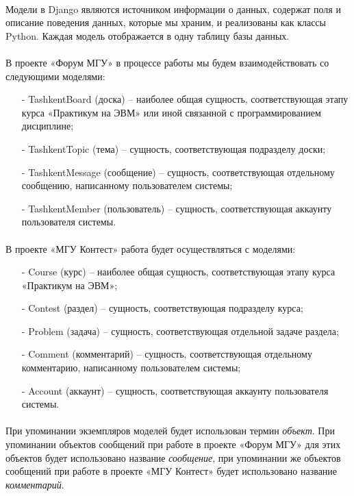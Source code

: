 \documentclass[12pt, a4paper, oneside]{article}
\begin{document}
\paragraph{}
Модели в Django являются источником информации о данных, содержат поля и описание поведения данных, которые мы храним, и реализованы как классы Python. Каждая модель отображается в одну таблицу базы данных.
\paragraph{}
В проекте «Форум МГУ» в процессе работы мы будем взаимодействовать со следующими моделями:
\begin{itemize}
    \item[-] TashkentBoard (доска) – наиболее общая сущность, соответствующая этапу курса «Практикум на ЭВМ» или иной связанной с программированием дисциплине;
    \item[-] TashkentTopic (тема) – сущность, соответствующая подразделу доски;
    \item[-] TashkentMessage (сообщение) – сущность, соответствующая отдельному сообщению, написанному пользователем системы;
    \item[-] TashkentMember (пользователь) – сущность, соответствующая аккаунту пользователя системы.
\end{itemize}
\paragraph{}
В проекте «МГУ Контест» работа будет осуществляться с моделями:
\begin{itemize}
    \item[-] Course (курс) – наиболее общая сущность, соответствующая этапу курса «Практикум на ЭВМ»;
    \item[-] Contest (раздел) – сущность, соответствующая подразделу курса;
    \item[-] Problem (задача) – сущность, соответствующая отдельной задаче раздела;
    \item[-] Comment (комментарий) – сущность, соответствующая отдельному комментарию, написанному пользователем системы; 
    \item[-] Account (аккаунт) – сущность, соответствующая аккаунту пользователя системы.
\end{itemize}
\paragraph{}
При упоминании экземпляров моделей будет использован термин \textit{объект}. При упоминании объектов сообщений при работе в проекте «Форум МГУ» для этих объектов будет использовано название \textit{сообщение}, при упоминании же объектов сообщений при работе в проекте «МГУ Контест» будет использовано название \textit{комментарий}.
\newpage
\end{document}
